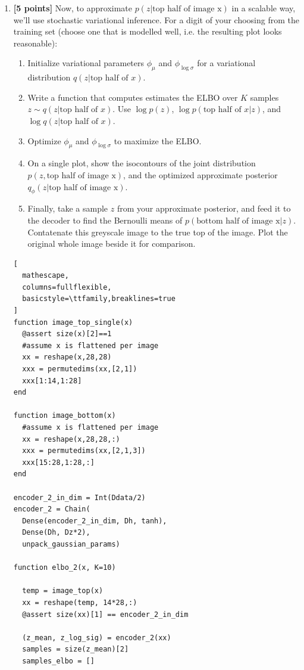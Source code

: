 \documentclass{article}
\begin{document}
\begin{enumerate}[label=(\alph*)]
	\item {\bf [5 points]} Now, to approximate $p(z | \text{top half of image x})$ in a scalable way, we'll use stochastic variational inference.  
    For a digit of your choosing from the training set (choose one that is modelled well, i.e. the resulting plot looks reasonable):

	\begin{enumerate}[label=(\alph*)]
		\item Initialize variational parameters $\phi_\mu$ and $\phi_{\log \sigma}$ for a variational distribution $q(z|\text{top half of $x$})$.
		\item Write a function that computes estimates the ELBO over $K$ samples $z \sim q(z|\text{top half of $x$})$.
		Use $\log p(z)$, $\log p(\text{top half of $x$} | z)$, and $\log q(z|\text{top half of $x$})$.
		\item Optimize $\phi_\mu$ and $\phi_{\log \sigma}$ to maximize the ELBO.
		\item On a single plot, show the isocontours of the joint distribution $p(z, \text{top half of image x})$, and the optimized approximate posterior $q_\phi(z | \text{top half of image x})$.
		\item Finally, take a sample $z$ from your approximate posterior, and feed it to the decoder to find the Bernoulli means of $p( \text{bottom half of image x}|z)$.  Contatenate this greyscale image to the true top of the image.
		Plot the original whole image beside it for comparison.
	\end{enumerate}

\begin{lstlisting}[
  mathescape,
  columns=fullflexible,
  basicstyle=\ttfamily,breaklines=true
]
function image_top_single(x)
  @assert size(x)[2]==1
  #assume x is flattened per image
  xx = reshape(x,28,28)
  xxx = permutedims(xx,[2,1])
  xxx[1:14,1:28]
end

function image_bottom(x)
  #assume x is flattened per image
  xx = reshape(x,28,28,:)
  xxx = permutedims(xx,[2,1,3])
  xxx[15:28,1:28,:]
end

encoder_2_in_dim = Int(Ddata/2)
encoder_2 = Chain(
  Dense(encoder_2_in_dim, Dh, tanh),
  Dense(Dh, Dz*2),
  unpack_gaussian_params)

function elbo_2(x, K=10)

  temp = image_top(x)
  xx = reshape(temp, 14*28,:)
  @assert size(xx)[1] == encoder_2_in_dim

  (z_mean, z_log_sig) = encoder_2(xx)
  samples = size(z_mean)[2]
  samples_elbo = []


\end{lstlisting}
\end{enumerate}
\end{document}
